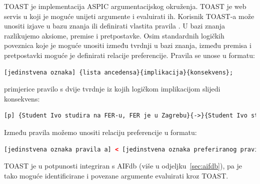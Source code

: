 TOAST  je implementacija ASPIC 
\citep{modgil2014aspic+} argumentacijskog okruženja. TOAST je web servis 
u koji je moguće unijeti argumente i evaluirati ih. 
Korisnik TOAST-a može unositi izjave u bazu znanja 
ili definirati vlastita pravila . U bazi znanja 
razlikujemo aksiome, premise i pretpostavke. Osim standardnih logičkih
poveznica koje je moguće unositi između tvrdnji u bazi znanja, 
između premisa i pretpostavki moguće je definirati relacije preferencije. 
Pravila se unose u formatu:
\lstset{language=XML}
\begin{lstlisting}[caption={},label={lst:format},language=XML, captionpos=b]
[jedinstvena oznaka] {lista ancedensa}{implikacija}{konsekvens};
\end{lstlisting}
primjerice pravilo s dvije tvrdnje iz kojih logičkom implikacijom slijedi konsekvens:
\lstset{language=XML}
\begin{lstlisting}[caption={},label={lst:format},language=XML, captionpos=b]
[p] {Student Ivo studira na FER-u, FER je u Zagrebu}{->}{Student Ivo studira u Zagrebu};
\end{lstlisting}
Između pravila možemo unositi relaciju preferencije u formatu:
\lstset{language=XML}
\begin{lstlisting}[caption={},label={lst:format},language=XML, captionpos=b]
    [jedinstvena oznaka pravila a] < [jedinstvena oznaka preferiranog pravila b] 
\end{lstlisting}
TOAST je u potpunosti integriran s AIFdb (više u odjeljku~\ref{sec:aifdb}), pa je 
tako moguće identificirane i povezane argumente evaluirati kroz TOAST. 
